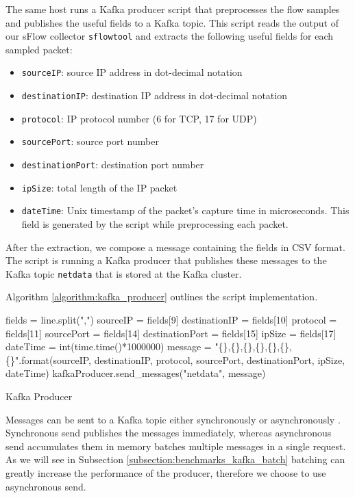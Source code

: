 The same host runs a Kafka producer script that preprocesses the flow samples and publishes the useful fields to a Kafka topic. This script reads the output of our sFlow collector \texttt{sflowtool} and extracts the following useful fields for each sampled packet:
\begin{itemize}
\item \texttt{sourceIP}: source IP address in dot-decimal notation
\item \texttt{destinationIP}: destination IP address in dot-decimal notation
\item \texttt{protocol}: IP protocol number (6 for TCP, 17 for UDP)
\item \texttt{sourcePort}: source port number
\item \texttt{destinationPort}: destination port number
\item \texttt{ipSize}: total length of the IP packet
\item \texttt{dateTime}: Unix timestamp of the packet's capture time in microseconds. This field is generated by the script while preprocessing each packet. 
\end{itemize}

After the extraction, we compose a message containing the fields in CSV format. The script is running a Kafka producer that publishes these messages to the Kafka topic \texttt{netdata} that is stored at the Kafka cluster. 

Algorithm \ref{algorithm:kafka_producer} outlines the script implementation.

\begin{algorithm}[H]
\begin{algorithmic}[1]
\State fields = line.split(",")
\State sourceIP = fields[9]
\State destinationIP = fields[10]
\State protocol = fields[11]
\State sourcePort = fields[14]
\State destinationPort = fields[15]
\State ipSize = fields[17]
\State dateTime = int(time.time()*1000000)
\State message = "\{\},\{\},\{\},\{\},\{\},\{\},\{\}".format(sourceIP, destinationIP, protocol, sourcePort, destinationPort, ipSize, dateTime)
\State kafkaProducer.send\_messages("netdata", message)
\EndFor
\end{algorithmic}
\caption{Kafka Producer}
\label{algorithm:kafka_producer}
\end{algorithm}

Messages can be sent to a Kafka topic either synchronously or asynchronously \cite{kafka_documentation}. Synchronous send publishes the messages immediately, whereas asynchronous send accumulates them in memory batches multiple messages in a single request. As we will see in Subsection \ref{subsection:benchmarks_kafka_batch} batching can greatly increase the performance of the producer, therefore we choose to use asynchronous send.


